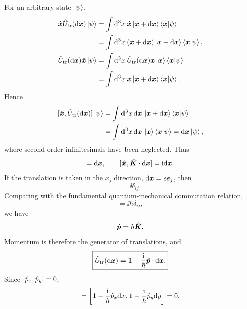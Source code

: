 For an arbitrary state $\left|\psi\right\rangle$,
\begin{equation}\begin{aligned}
\hat{\bm{x}}\hat{U}_{\mathrm{tr}}(\mathrm{d}\bm{x})\left|\psi\right\rangle
&=\int\mathrm{d}^3x\,\hat{\bm{x}}\left|\bm{x}+\mathrm{d}\bm{x}\right\rangle\left\langle\bm{x}\middle|\psi\right\rangle\\
&=\int\mathrm{d}^3x\,(\bm{x}+\mathrm{d}\bm{x})\left|\bm{x}+\mathrm{d}\bm{x}\right\rangle\left\langle\bm{x}\middle|\psi\right\rangle,\\
\hat{U}_{\mathrm{tr}}(\mathrm{d}\bm{x})\hat{\bm{x}}\left|\psi\right\rangle
&=\int\mathrm{d}^3x\,\hat{U}_{\mathrm{tr}}(\mathrm{d}\bm{x})\bm{x}\left|\bm{x}\right\rangle\left\langle\bm{x}\middle|\psi\right\rangle\\
&=\int\mathrm{d}^3x\,\bm{x}\left|\bm{x}+\mathrm{d}\bm{x}\right\rangle\left\langle\bm{x}\middle|\psi\right\rangle.
\end{aligned}\end{equation}
Hence
\begin{equation}\begin{aligned}
[\op{\vect x},\op U_{\mathrm{tr}}(\dd\vect x)]\ket\psi
&=\int\dd^3x\,\dd\vect x\,\ket{\vect x+\dd\vect x}\braket{\vect x}\psi\\
&=\int\dd^3x\,\dd\vect x\,\ket{\vect x}\braket{\vect x}\psi
=\dd\vect x\ket\psi,
\end{aligned}\end{equation}
where second-order infinitesimals have been neglected. Thus
\begin{equation}
[\op{\vect x},\op U_{\mathrm{tr}}(\dd\vect x)]=\dd\vect x,\qquad
[\op{\vect x},\op{\vect K}\cdot\dd\vect x]=\ii\dd\vect x.
\end{equation}
If the translation is taken in the $x_j$ direction, $\mathrm{d}\bm{x}=\epsilon\bm{e}_j$, then
\begin{equation}
[\op x_i,\op K_j]=\ii\delta_{ij}.
\end{equation}
Comparing with the fundamental quantum-mechanical commutation relation,
\begin{equation}
[\op x_i,\op p_j]=\ii\hbar\delta_{ij},
\end{equation}
we have
\begin{equation}
\hat{\bm{p}}=\hbar\hat{\bm{K}}.
\end{equation}
Momentum is therefore the generator of translations, and
\begin{equation}
\boxed{\hat{U}_{\mathrm{tr}}(\mathrm{d}\bm{x})=\mathbf1-\frac{\mathrm{i}}\hbar\hat{\bm{p}}\cdot\mathrm{d}\bm{x}.}
\end{equation}
Since $[\hat{p}_x,\hat{p}_y]=0$,
\begin{equation}
[\op U_{\mathrm{tr}}(\dd x),\op U_{\mathrm{tr}}(\dd y)]
=\left[\mathbf1-\frac\ii\hbar\op p_x\dd x,
        \mathbf1-\frac\ii\hbar\op p_y\dd y\right]=0.
\end{equation}
